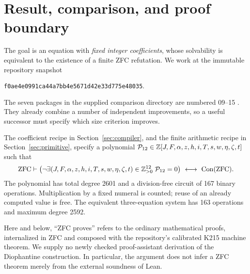 \section{Result, comparison, and proof boundary}
\label{sec:overview}

The goal is an equation with \emph{fixed integer coefficients}, whose
solvability is equivalent to the existence of a finite ZFC refutation.
We work at the immutable repository snapshot
\begin{center}\small\texttt{f0ae4e0991ca44a7bb4e5671d42e33d775e48035}.\end{center}
The seven packages in the supplied comparison directory are numbered
09--15 \cite{RepoComparison}.  They already combine a number of independent improvements,
so a useful successor must specify which size criterion improves.

\begin{theorem}
\label{thm:main}
The coefficient recipe in Section~\ref{sec:compiler}, and the finite
arithmetic recipe in Section~\ref{sec:primitive}, specify a polynomial
$\mathcal P_{12}\in\mathbb Z[J,F,\alpha,z,h,i,T,s,w,\eta,\zeta,t]$ such that
\[
\mathrm{ZFC}\vdash
\left(\neg\exists (J,F,\alpha,z,h,i,T,s,w,\eta,\zeta,t)
 \in\mathbb Z_{>0}^{12}\;\mathcal P_{12}=0\right)
\ \longleftrightarrow\ \operatorname{Con}(\mathrm{ZFC}).
\]
The polynomial has total degree 2601 and a division-free circuit of
167 binary operations.  Multiplication by a fixed numeral is counted;
reuse of an already computed value is free.  The equivalent
three-equation system has 163 operations and maximum degree 2592.
\end{theorem}

Here and below, ``ZFC proves'' refers to the ordinary mathematical
proofs, internalized in ZFC and composed with the repository's calibrated
K215 machine theorem.  We supply no newly checked proof-assistant
derivation of the Diophantine construction.  In particular, the argument
does not infer a ZFC theorem merely from the external soundness of Lean.

